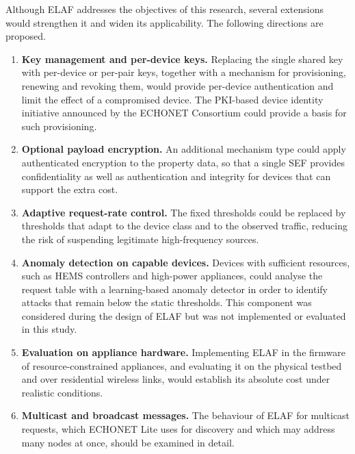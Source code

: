 Although ELAF addresses the objectives of this research, several extensions would strengthen it and widen its applicability. The following directions are proposed.

\begin{enumerate}
  \item \textbf{Key management and per-device keys.} Replacing the single shared key with per-device or per-pair keys, together with a mechanism for provisioning, renewing and revoking them, would provide per-device authentication and limit the effect of a compromised device. The PKI-based device identity initiative announced by the ECHONET Consortium \citep{SEALSQ2026} could provide a basis for such provisioning.
  \item \textbf{Optional payload encryption.} An additional mechanism type could apply authenticated encryption to the property data, so that a single SEF provides confidentiality as well as authentication and integrity for devices that can support the extra cost.
  \item \textbf{Adaptive request-rate control.} The fixed thresholds could be replaced by thresholds that adapt to the device class and to the observed traffic, reducing the risk of suspending legitimate high-frequency sources.
  \item \textbf{Anomaly detection on capable devices.} Devices with sufficient resources, such as HEMS controllers and high-power appliances, could analyse the request table with a learning-based anomaly detector in order to identify attacks that remain below the static thresholds. This component was considered during the design of ELAF but was not implemented or evaluated in this study.
  \item \textbf{Evaluation on appliance hardware.} Implementing ELAF in the firmware of resource-constrained appliances, and evaluating it on the physical testbed and over residential wireless links, would establish its absolute cost under realistic conditions.
  \item \textbf{Multicast and broadcast messages.} The behaviour of ELAF for multicast requests, which ECHONET Lite uses for discovery and which may address many nodes at once, should be examined in detail.
\end{enumerate}
